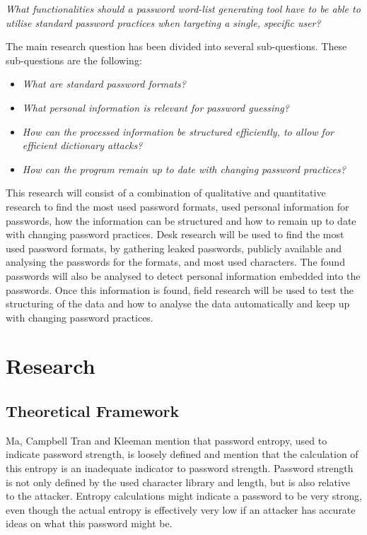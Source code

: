\documentclass[a4paper,12pt]{article}
\begin{document}
\textit{What functionalities should a password word-list generating tool have to be able to utilise standard password practices when targeting a single, specific user?}

The main research question has been divided into several sub-questions. These sub-questions are the following:

\begin{itemize}
\item \textit{What are standard password formats?}
\item \textit{What personal information is relevant for password guessing?}
\item \textit{How can the processed information be structured efficiently, to allow for efficient dictionary attacks?}
\item \textit{How can the program remain up to date with changing password practices?}
\end{itemize}

This research will consist of a combination of qualitative and quantitative research to find the most used password formats, used personal information for passwords, how the information can be structured and how to remain up to date with changing password practices. Desk research will be used to find the most used password formats, by gathering leaked passwords, publicly available and analysing the passwords for the formats, and most used characters. The found passwords will also be analysed to detect personal information embedded into the passwords. Once this information is found, field research will be used to test the structuring of the data and how to analyse the data automatically and keep up with changing password practices.

\newpage
\section{Research}

\subsection{Theoretical Framework}
Ma, Campbell Tran and Kleeman \cite{bib:entro} mention that password entropy, used to indicate password strength, is loosely defined and mention that the calculation of this entropy is an inadequate indicator to password strength. Password strength is not only defined by the used character library and length, but is also relative to the attacker. Entropy calculations might indicate a password to be very strong, even though the actual entropy is effectively very low if an attacker has accurate ideas on what this password might be.\\
\end{document}
